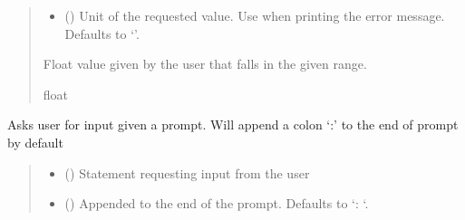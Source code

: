 \documentclass[letterpaper,10pt,english]{sphinxmanual}
\begin{document}
\begin{fulllineitems}
\begin{fulllineitems}
\begin{quote}
\begin{description}
\begin{itemize}
\item {} 
\sphinxAtStartPar
{} (\sphinxstyleliteralemphasis{\sphinxupquote{, }}) \textendash{} Unit of the requested value. Use when printing the error message.                 Defaults to ‘’.

\end{itemize}

\sphinxAtStartPar
Float value given by the user that falls in the given range.

\sphinxAtStartPar
float

\end{description}\end{quote}

\end{fulllineitems}


\begin{fulllineitems}
\label{\detokenize{GetUserInput:GetUserInput.UserInput.AskForInput}}
\pysigstartsignatures
{}
\pysigstopsignatures
\sphinxAtStartPar
Asks user for input given a prompt. Will append a colon ‘:’ to the end of prompt by default
\begin{quote}\begin{description}
\begin{itemize}
\item {} 
\sphinxAtStartPar
{} () \textendash{} Statement requesting input from the user

\item {} 
\sphinxAtStartPar
{} (\sphinxstyleliteralemphasis{\sphinxupquote{, }}) \textendash{} Appended to the end of the prompt. Defaults to ‘: ‘.


\end{itemize}
\end{description}
\end{quote}
\end{fulllineitems}
\end{fulllineitems}
\end{document}

